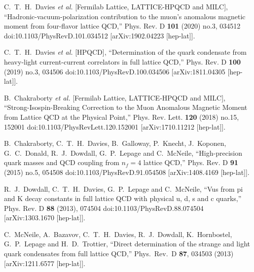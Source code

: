 \begin{thebibliography}{130}
C.~T.~H.~Davies \textit{et al.} [Fermilab Lattice, LATTICE-HPQCD and
  MILC],
``Hadronic-vacuum-polarization contribution to the
muon\textquoteright{}s anomalous magnetic moment from four-flavor
lattice QCD,''
Phys. Rev. D \textbf{101} (2020) no.3, 034512
doi:10.1103/PhysRevD.101.034512
[arXiv:1902.04223 [hep-lat]].

C.~T.~H.~Davies \textit{et al.} [HPQCD],
``Determination of the quark condensate from heavy-light
current-current correlators in full lattice QCD,''
Phys. Rev. D \textbf{100} (2019) no.3, 034506
doi:10.1103/PhysRevD.100.034506
[arXiv:1811.04305 [hep-lat]].

B.~Chakraborty \textit{et al.} [Fermilab Lattice, LATTICE-HPQCD and
  MILC],
``Strong-Isospin-Breaking Correction to the Muon Anomalous Magnetic
Moment from Lattice QCD at the Physical Point,''
Phys. Rev. Lett. \textbf{120} (2018) no.15, 152001
doi:10.1103/PhysRevLett.120.152001
[arXiv:1710.11212 [hep-lat]].

B.~Chakraborty, C.~T.~H.~Davies, B.~Galloway, P.~Knecht, J.~Koponen,
G.~C.~Donald, R.~J.~Dowdall, G.~P.~Lepage and C.~McNeile,
``High-precision quark masses and QCD coupling from $n_f=4$ lattice
QCD,''
Phys. Rev. D \textbf{91} (2015) no.5, 054508
doi:10.1103/PhysRevD.91.054508
[arXiv:1408.4169 [hep-lat]].

R.~J.~Dowdall, C.~T.~H.~Davies, G.~P.~Lepage and C.~McNeile,
``Vus from pi and K decay constants in full lattice QCD with physical
u, d, s and c quarks,''
Phys. Rev. D \textbf{88} (2013), 074504
doi:10.1103/PhysRevD.88.074504
[arXiv:1303.1670 [hep-lat]].


  C.~McNeile, A.~Bazavov, C.~T.~H.~Davies, R.~J.~Dowdall,
  K.~Hornbostel, G.~P.~Lepage and H.~D.~Trottier,
  ``Direct determination of the strange and light quark condensates
  from full lattice QCD,''
  Phys.\ Rev.\ D {\bf 87}, 034503 (2013)
  [arXiv:1211.6577 [hep-lat]].



\end{thebibliography}
